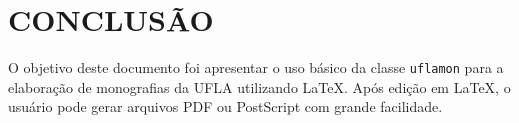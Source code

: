 \chapter{CONCLUSÃO}
\label{cap:conclusao}

O objetivo deste documento foi apresentar o uso básico da classe {\tt uflamon} para a elaboração de monografias da UFLA utilizando \LaTeX. Após edição em \LaTeX, o usuário pode gerar arquivos PDF \cite{PDF2004} ou PostScript \cite{PostScript1999} com grande facilidade.
